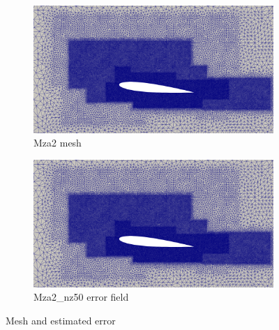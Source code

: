\begin{figure}[H]
	
	\begin{subfigure}[b]{0.475\textwidth}
		\centering
		\includegraphics[width=1\textwidth]{figures/zonal_adapt_results/Mesh_and_error_plots_Re200k/Mza2_inplane.png}
		\caption{Mza2 mesh}
		\label{fig:zonal_Mza2_mesh_Re200k}
	\end{subfigure}
	\begin{subfigure}[b]{0.475\textwidth}
		\centering
		\includegraphics[width=1\textwidth]{figures/zonal_adapt_results/Mesh_and_error_plots_Re200k/Mza2_inplane.png}
		\caption{Mza2\_nz50 error field}
		\label{fig:zonal_Mza2_error_Re200k}
	\end{subfigure}
	
	\caption{Mesh and estimated error}
\end{figure}